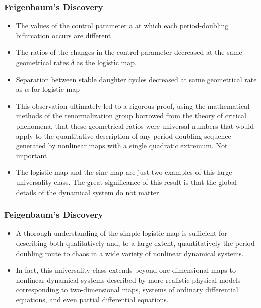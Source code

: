 \documentclass[
	11pt, %
	aspectratio=169, %
]{beamer}
\begin{document}
\begin{frame}
	\frametitle{Feigenbaum's Discovery}
	
	\begin{itemize}
        \item  The values of the control parameter a at which each period-doubling bifurcation occurs are different \pause
        \item The ratios of the changes in the control parameter decreased at the same geometrical rates $\delta$ as the logistic map. \pause
        \item Separation between stable daughter cycles decreased at same geometrical rate as $\alpha$ for logistic map \pause
        \item {\color{red} This observation ultimately led to a rigorous proof, using the mathematical methods of the renormalization group borrowed from the theory of critical phenomena, that these geometrical ratios were universal numbers that would apply to the quantitative description of any period-doubling sequence generated by nonlinear maps with a single quadratic extremum.} Not important \pause
        \item The logistic map and the sine map are just two examples of this large universality class. The great significance of this result is that the global details of the dynamical system do not matter.
    \end{itemize}

\end{frame}


\begin{frame}
	\frametitle{Feigenbaum's Discovery}
	
	\begin{itemize}
        \item A thorough understanding of the simple logistic map is sufficient for describing both qualitatively and, to a large extent, quantitatively the period-doubling route to chaos in a wide variety of nonlinear dynamical systems. \pause
        \item In fact, this universality class extends beyond one-dimensional maps to nonlinear dynamical systems described by more realistic physical models corresponding to two-dimensional maps, systems of ordinary differential equations, and even partial differential equations.
    \end{itemize}

\end{frame}
\end{document}
